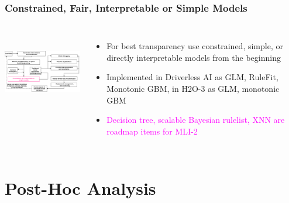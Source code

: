 \documentclass[11pt,
               aspectratio=169,
               hyperref={colorlinks}
               ]{beamer}
\begin{document}
		\begin{frame}
		
			\frametitle{Constrained, Fair, Interpretable or Simple Models}		
			
			\begin{columns}
	
				\centering
				\includegraphics[height=100pt]{img/im.png}
				
				\vspace{-5pt}
				\begin{itemize}
					\item For best transparency use constrained, simple, or directly interpretable models from the beginning
					\item Implemented in Driverless AI as GLM, RuleFit, Monotonic GBM, in H2O-3 as GLM, monotonic GBM
					\item \textcolor{magenta}{Decision tree, scalable Bayesian rulelist, XNN are roadmap items for MLI-2}
				\end{itemize}
				
			\end{columns}			
			
		\end{frame}

	\section{Post-Hoc Analysis}
\end{document}

